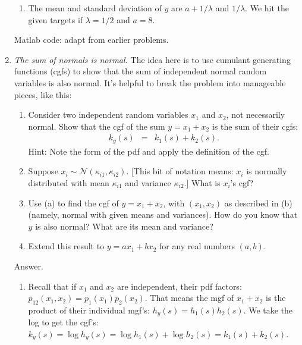 \documentclass[11pt]{article}
\begin{document}
\begin{enumerate}
\begin{enumerate}
\item The mean and standard deviation of $y$ are
$ a + 1/\lambda $ and $1/\lambda$.
We hit the given targets if $\lambda = 1/2 $ and $ a = 8$.
\end{enumerate}
Matlab code:  adapt from earlier problems.


\item {\it The sum of normals is normal.\/}
The idea here is to use cumulant generating functions (cgfs)
to show that the sum of independent normal random variables is also normal.
It's helpful to break the problem into manageable pieces, like this:
\begin{enumerate}
\item Consider two independent random variables $x_1$ and $x_2$,
    not necessarily normal.
    Show that the cgf of the sum $y = x_1 + x_2$ is the sum of their cgfs:
\begin{eqnarray*}
	k_y(s) &=& k_1(s) + k_2(s) .
\end{eqnarray*}
Hint: Note the form of the pdf and apply the definition of the cgf.

\item Suppose $x_i \sim \mathcal{N}(\kappa_{i1}, \kappa_{i2})$.
[This bit of notation means:   $x_i$ is normally distributed with
mean $\kappa_{i1}$ and variance $\kappa_{i2}$.]
What is $x_i$'s cgf?

\item Use (a) to find the cgf of $y = x_1 + x_2$,
with $(x_1,x_2)$ as described in (b) (namely, normal with given means and variances).
How do you know that $y$ is also normal?  What are its mean and variance?

\item Extend this result to $y = a x_1 + b x_2$ for any real numbers $(a,b)$.
\end{enumerate}
%
Answer.
\begin{enumerate}
\item Recall that if $x_1$ and $x_2$ are independent, their pdf factors:
$ p_{12}(x_1,x_2) = p_1(x_1) p_2(x_2) $.
That means the mgf of $x_1+x_2$ is the product of their individual mgf's:
$ h_y(s) = h_1(s) h_2(s) $.
We take the log to get the cgf's:
$ k_y(s) = \log h_y(s) = \log h_1(s) + \log h_2(s) = k_1(s) + k_2(s) $.


\end{enumerate}
\end{enumerate}
\end{document}
